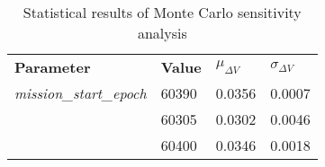 
                    \begin{table}[]
                    \centering
                    \begin{tabular}{l l l l}
                    \rowcolor[HTML]{EFEFEF} \textbf{Parameter} & \textbf{Value} & \textbf{$\mu_{\Delta V}$} & \textbf{$\sigma_{\Delta V}$} \\
                    \textit{mission\_start\_epoch} & 60390 & 0.0356 & 0.0007 \\
 & 60305 & 0.0302 & 0.0046 \\
 & 60400 & 0.0346 & 0.0018 \\

                    \end{tabular}
                    \caption{Statistical results of Monte Carlo sensitivity analysis}
                    \label{tab:SensitivityAnalysis}
                    \end{table}
                    